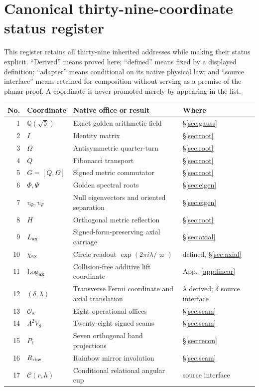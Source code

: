 \documentclass[10pt]{article}
\newcommand{\Q}{\mathbb Q}
\begin{document}
\section{Canonical thirty-nine-coordinate status register}
This register retains all thirty-nine inherited addresses while making their
status explicit. ``Derived'' means proved here; ``defined''
means fixed by a displayed definition; ``adapter'' means conditional on its
native physical law; and ``source interface'' means retained for composition
without serving as a premise of the planar proof. A coordinate is never
promoted merely by appearing in the list.
\small
\begin{longtable}{@{}r p{} p{} p{}@{}}\toprule No.&Coordinate&Native office or result&Where\\\midrule\endhead
1&$\Q(\sqrt5)$&Exact golden arithmetic field&\S\ref{sec:gauss}\\
2&$I$&Identity matrix&\S\ref{sec:root}\\
3&$\Omega$&Antisymmetric quarter-turn&\S\ref{sec:root}\\
4&$Q$&Fibonacci transport&\S\ref{sec:root}\\
5&$G=[Q,\Omega]$&Signed metric commutator&\S\ref{sec:root}\\
6&$\Phi,\Psi$&Golden spectral roots&\S\ref{sec:eigen}\\
7&$v_\Phi,v_\Psi$&Null eigenvectors and oriented separation&\S\ref{sec:eigen}\\
8&$H$&Orthogonal metric reflection&\S\ref{sec:root}\\
9&$L_{\rm ax}$&Signed-form-preserving axial carriage&\S\ref{sec:axial}\\
10&$\chi_{\rm ax}$&Circle readout $\exp(2\pi i\lambda/\varpi)$&defined, \S\ref{sec:axial}\\
11&$\operatorname{Log}_{\rm ax}$&Collision-free additive lift coordinate&App.~\ref{app:linear}\\
12&$(\delta,\lambda)$&Transverse Fermi coordinate and axial translation&$\lambda$ derived; $\delta$ source interface\\
13&$\mathcal O_8$&Eight operational offices&\S\ref{sec:seam}\\
14&$\Lambda^2V_8$&Twenty-eight signed seams&\S\ref{sec:seam}\\
15&$P_\ell$&Seven orthogonal band projections&\S\ref{sec:recon}\\
16&$R_{\rm rbw}$&Rainbow mirror involution&\S\ref{sec:seam}\\
17&$\mathcal C(r,h)$&Conditional relational angular cup&source interface\\

\end{longtable}
\end{document}
